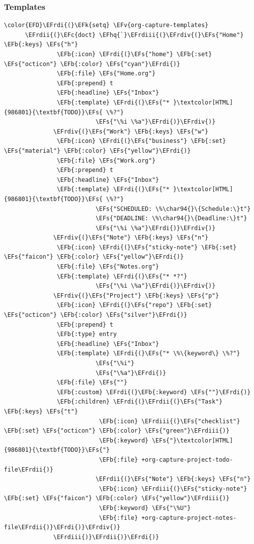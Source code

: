 \documentclass{scrartcl}
\newcommand{\EFk}[1]{\textcolor{EFk}{#1}} %
\newcommand{\EFs}[1]{\textcolor{EFs}{#1}} %
\newcommand{\EFb}[1]{\textcolor{EFb}{#1}} %
\newcommand{\EFc}[1]{\textcolor{EFc}{#1}} %
\newcommand{\EFv}[1]{\textcolor{EFv}{#1}} %
\newcommand{\EFhq}[1]{\textcolor{EFhq}{#1}} %
\newcommand{\EFrdi}[1]{\textcolor{EFrdi}{#1}} %
\newcommand{\EFrdii}[1]{\textcolor{EFrdii}{#1}} %
\newcommand{\EFrdiii}[1]{\textcolor{EFrdiii}{#1}} %
\newcommand{\EFrdiv}[1]{\textcolor{EFrdiv}{#1}} %
\begin{document}
\subsubsection{Templates}
\label{sec:orge7c1394}
\begin{Code}
\begin{Verbatim}[]
\color{EFD}\EFrdi{(}\EFk{setq} \EFv{org-capture-templates}
      \EFrdii{(}\EFc{doct} \EFhq{`}\EFrdiii{(}\EFrdiv{(}\EFs{"Home"} \EFb{:keys} \EFs{"h"}
               \EFb{:icon} \EFrdi{(}\EFs{"home"} \EFb{:set} \EFs{"octicon"} \EFb{:color} \EFs{"cyan"}\EFrdi{)}
               \EFb{:file} \EFs{"Home.org"}
               \EFb{:prepend} t
               \EFb{:headline} \EFs{"Inbox"}
               \EFb{:template} \EFrdi{(}\EFs{"* }\textcolor[HTML]{986801}{\textbf{TODO}}\EFs{ \%?"}
                          \EFs{"\%i \%a"}\EFrdi{)}\EFrdiv{)}
              \EFrdiv{(}\EFs{"Work"} \EFb{:keys} \EFs{"w"}
               \EFb{:icon} \EFrdi{(}\EFs{"business"} \EFb{:set} \EFs{"material"} \EFb{:color} \EFs{"yellow"}\EFrdi{)}
               \EFb{:file} \EFs{"Work.org"}
               \EFb{:prepend} t
               \EFb{:headline} \EFs{"Inbox"}
               \EFb{:template} \EFrdi{(}\EFs{"* }\textcolor[HTML]{986801}{\textbf{TODO}}\EFs{ \%?"}
                          \EFs{"SCHEDULED: \%\char94{}\{Schedule:\}t"}
                          \EFs{"DEADLINE: \%\char94{}\{Deadline:\}t"}
                          \EFs{"\%i \%a"}\EFrdi{)}\EFrdiv{)}
              \EFrdiv{(}\EFs{"Note"} \EFb{:keys} \EFs{"n"}
               \EFb{:icon} \EFrdi{(}\EFs{"sticky-note"} \EFb{:set} \EFs{"faicon"} \EFb{:color} \EFs{"yellow"}\EFrdi{)}
               \EFb{:file} \EFs{"Notes.org"}
               \EFb{:template} \EFrdi{(}\EFs{"* *?"}
                          \EFs{"\%i \%a"}\EFrdi{)}\EFrdiv{)}
              \EFrdiv{(}\EFs{"Project"} \EFb{:keys} \EFs{"p"}
               \EFb{:icon} \EFrdi{(}\EFs{"repo"} \EFb{:set} \EFs{"octicon"} \EFb{:color} \EFs{"silver"}\EFrdi{)}
               \EFb{:prepend} t
               \EFb{:type} entry
               \EFb{:headline} \EFs{"Inbox"}
               \EFb{:template} \EFrdi{(}\EFs{"* \%\{keyword\} \%?"}
                          \EFs{"\%i"}
                          \EFs{"\%a"}\EFrdi{)}
               \EFb{:file} \EFs{""}
               \EFb{:custom} \EFrdi{(}\EFb{:keyword} \EFs{""}\EFrdi{)}
               \EFb{:children} \EFrdi{(}\EFrdii{(}\EFs{"Task"} \EFb{:keys} \EFs{"t"}
                           \EFb{:icon} \EFrdiii{(}\EFs{"checklist"} \EFb{:set} \EFs{"octicon"} \EFb{:color} \EFs{"green"}\EFrdiii{)}
                           \EFb{:keyword} \EFs{"}\textcolor[HTML]{986801}{\textbf{TODO}}\EFs{"}
                           \EFb{:file} +org-capture-project-todo-file\EFrdii{)}
                          \EFrdii{(}\EFs{"Note"} \EFb{:keys} \EFs{"n"}
                           \EFb{:icon} \EFrdiii{(}\EFs{"sticky-note"} \EFb{:set} \EFs{"faicon"} \EFb{:color} \EFs{"yellow"}\EFrdiii{)}
                           \EFb{:keyword} \EFs{"\%U"}
                           \EFb{:file} +org-capture-project-notes-file\EFrdii{)}\EFrdi{)}\EFrdiv{)}
              \EFrdiii{)}\EFrdii{)}\EFrdi{)}
\end{Verbatim}
\end{Code}
\end{document}
